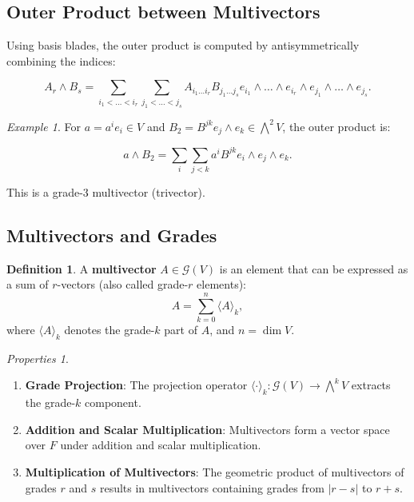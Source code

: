 \documentclass[a4paper,14pt]{article}
\theoremstyle{plain} %
\theoremstyle{definition} %
\theoremstyle{remark} %
\theoremstyle{definition}
\newtheorem{definition}{Definition}[section]
\theoremstyle{remark}
\newtheorem*{properties}{Properties}
\theoremstyle{remark}
\newtheorem{example}{Example}[section]
\begin{document}
	\subsection{Outer Product between Multivectors}
	
	Using basis blades, the outer product is computed by antisymmetrically combining the indices:
	
	\[
	A_r \wedge B_s = \sum_{i_1 < \dots < i_r} \sum_{j_1 < \dots < j_s} A_{i_1 \dots i_r} B_{j_1 \dots j_s} e_{i_1} \wedge \dots \wedge e_{i_r} \wedge e_{j_1} \wedge \dots \wedge e_{j_s}.
	\]
	
	\begin{example}
		For \( a = a^i e_i \in V \) and \( B_2 = B^{jk} e_j \wedge e_k \in \bigwedge^2 V \), the outer product is:
		
		\[
		a \wedge B_2 = \sum_{i} \sum_{j < k} a^i B^{jk} e_i \wedge e_j \wedge e_k.
		\]
		
		This is a grade-3 multivector (trivector).
	\end{example}
	
	\subsection{Multivectors and Grades}
	
	\begin{definition}
		A \textbf{multivector} \( A \in \mathcal{G}(V) \) is an element that can be expressed as a sum of \( r \)-vectors (also called grade-\( r \) elements):
		\[
		A = \sum_{k=0}^n \langle A \rangle_k,
		\]
		where \( \langle A \rangle_k \) denotes the grade-\( k \) part of \( A \), and \( n = \dim V \).
	\end{definition}
	
	\begin{properties}
		\begin{enumerate}
			\item \textbf{Grade Projection}:
			The projection operator \( \langle \cdot \rangle_k : \mathcal{G}(V) \rightarrow \bigwedge^k V \) extracts the grade-\( k \) component.
			\item \textbf{Addition and Scalar Multiplication}:
			Multivectors form a vector space over \( F \) under addition and scalar multiplication.
			\item \textbf{Multiplication of Multivectors}:
			The geometric product of multivectors of grades \( r \) and \( s \) results in multivectors containing grades from \( |r - s| \) to \( r + s \).
		\end{enumerate}
	\end{properties}
	
\end{document}
